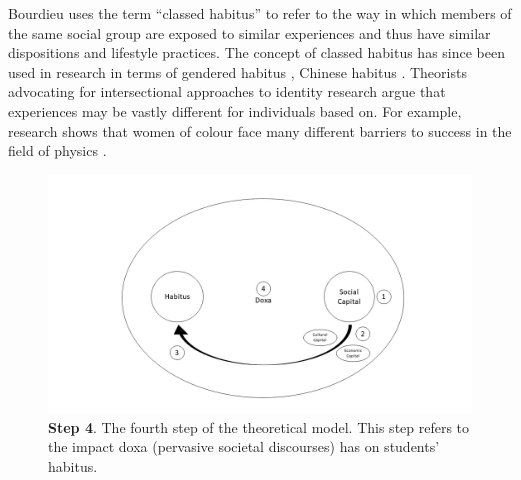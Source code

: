 Bourdieu uses the term ``classed habitus'' to refer to the way in which members of the same social group are exposed to similar experiences and thus have similar dispositions and lifestyle practices. The concept of classed habitus has since been used in research in terms of gendered habitus \citep{Reay_2004}, Chinese habitus \citep{Mu2014}. Theorists advocating for intersectional approaches to identity research argue that experiences may be vastly different for individuals based on. For example, research shows that women of colour face many different barriers to success in the field of physics \cite{ong2005body}.

\begin{figure}[ht]
\centering
\includegraphics[width=\textwidth]{C5 - Understanding Capital Accumulation/HabitusSocCap_TheoreticalModel4.png}
\caption{\label{fig:TheoreticalModel4_C5}\textbf{Step 4}. The fourth step of the theoretical model. This step refers to the impact doxa (pervasive societal discourses) has on students' habitus.}
\end{figure}

